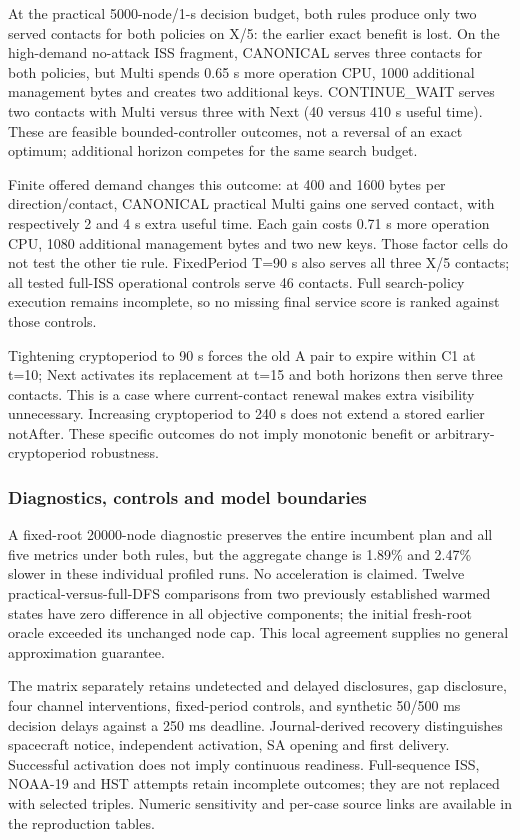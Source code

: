 At the practical 5000-node/1-s decision budget, both rules produce only two served contacts for both policies on X/5: the earlier exact benefit is lost. On the high-demand no-attack ISS fragment, CANONICAL serves three contacts for both policies, but Multi spends 0.65 s more operation CPU, 1000 additional management bytes and creates two additional keys. CONTINUE\_WAIT serves two contacts with Multi versus three with Next (40 versus 410 s useful time). These are feasible bounded-controller outcomes, not a reversal of an exact optimum; additional horizon competes for the same search budget.

Finite offered demand changes this outcome: at 400 and 1600 bytes per direction/contact, CANONICAL practical Multi gains one served contact, with respectively 2 and 4 s extra useful time. Each gain costs 0.71 s more operation CPU, 1080 additional management bytes and two new keys. Those factor cells do not test the other tie rule. FixedPeriod T=90 s also serves all three X/5 contacts; all tested full-ISS operational controls serve 46 contacts. Full search-policy execution remains incomplete, so no missing final service score is ranked against those controls.

Tightening cryptoperiod to 90 s forces the old A pair to expire within C1 at t=10; Next activates its replacement at t=15 and both horizons then serve three contacts. This is a case where current-contact renewal makes extra visibility unnecessary. Increasing cryptoperiod to 240 s does not extend a stored earlier notAfter. These specific outcomes do not imply monotonic benefit or arbitrary-cryptoperiod robustness.

\subsubsection{Diagnostics, controls and model boundaries}

A fixed-root 20000-node diagnostic preserves the entire incumbent plan and all five metrics under both rules, but the aggregate change is 1.89\% and 2.47\% slower in these individual profiled runs. No acceleration is claimed. Twelve practical-versus-full-DFS comparisons from two previously established warmed states have zero difference in all objective components; the initial fresh-root oracle exceeded its unchanged node cap. This local agreement supplies no general approximation guarantee.

The matrix separately retains undetected and delayed disclosures, gap disclosure, four channel interventions, fixed-period controls, and synthetic 50/500 ms decision delays against a 250 ms deadline. Journal-derived recovery distinguishes spacecraft notice, independent activation, SA opening and first delivery. Successful activation does not imply continuous readiness. Full-sequence ISS, NOAA-19 and HST attempts retain incomplete outcomes; they are not replaced with selected triples. Numeric sensitivity and per-case source links are available in the reproduction tables.
